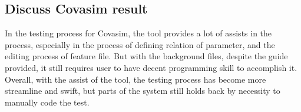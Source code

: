 \subsection{Discuss Covasim result}
In the testing process for Covasim, the tool provides a lot of assists in the process, especially in the process of defining relation of parameter, and the editing process of feature file. But with the background files, despite the guide provided, it still requires user to have decent programming skill to accomplish it. Overall, with the assist of the tool, the testing process has become more streamline and swift, but parts of the system still holds back by necessity to manually code the test.




